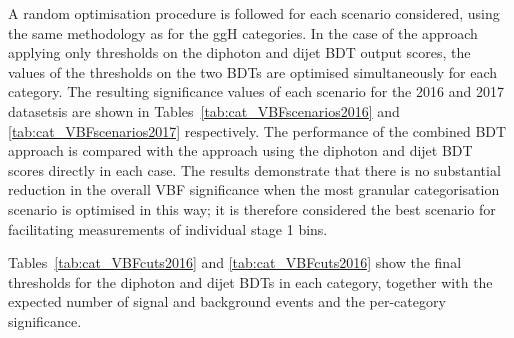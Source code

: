 A random optimisation procedure is followed for each scenario considered, 
using the same methodology as for the ggH categories.
In the case of the approach applying only thresholds on the diphoton and dijet BDT output scores, 
the values of the thresholds on the two BDTs are optimised simultaneously for each category.
The resulting significance values of each scenario for the 2016 and 2017 datasetsis 
are shown in Tables~\ref{tab:cat_VBFscenarios2016} and \ref{tab:cat_VBFscenarios2017} respectively.
The performance of the combined BDT approach is compared with the approach using the diphoton 
and dijet BDT scores directly in each case.
The results demonstrate that there is no substantial reduction in the overall VBF significance
when the most granular categorisation scenario is optimised in this way;
it is therefore considered the best scenario for facilitating measurements of individual stage 1 bins.

Tables~\ref{tab:cat_VBFcuts2016} and \ref{tab:cat_VBFcuts2016} show the final thresholds 
for the diphoton and dijet BDTs in each category, 
together with the expected number of signal and background events and the per-category significance.
